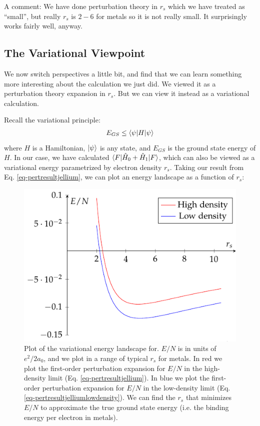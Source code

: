 A comment: We have done perturbation theory in $r_s$ which we have treated as ``small'', but really $r_s$ is $2-6$ for metals so it is not really small. It surprisingly works fairly well, anyway.

\subsection{The Variational Viewpoint}
We now switch perspectives a little bit, and find that we can learn something more interesting about the calculation we just did. We viewed it as a perturbation theory expansion in $r_s$. But we can view it instead as a variational calculation.

Recall the variational principle:
\begin{align*}
    E_{GS} \leq \langle \psi \rvert H\lvert \psi \rangle
\end{align*}
where $H$ is a Hamiltonian, $\lvert \psi \rangle$ is any state, and $E_{GS}$ is the ground state energy of $H$. In our case, we have calculated $\langle F \rvert\hat{H}_0 + \hat{H}_1\lvert F \rangle$, which can also be viewed as a variational energy parametrized by electron density $r_s$. Taking our result from Eq. \eqref{eq-pertresultjellium}, we can plot an energy landscape as a function of $r_s$:

\begin{figure}[htbp]
    \centering
    \includegraphics[]{Images/fig-jelliumenergylandscape.pdf}

    \caption{Plot of the variational energy landscape for. $E/N$ is in units of $e^2/2a_0$, and we plot in a range of typical $r_s$ for metals. In red we plot the first-order perturbation expansion for $E/N$ in the high-density limit (Eq. \eqref{eq-pertresultjellium}). In blue we plot the first-order perturbation expansion for $E/N$ in the low-density limit (Eq. \eqref{eq-pertresultjelliumlowdensity}). We can find the $r_s$ that minimizes $E/N$ to approximate the true ground state energy (i.e. the binding energy per electron in metals).}
    \label{fig-jelliumenergylandscape}
\end{figure}

